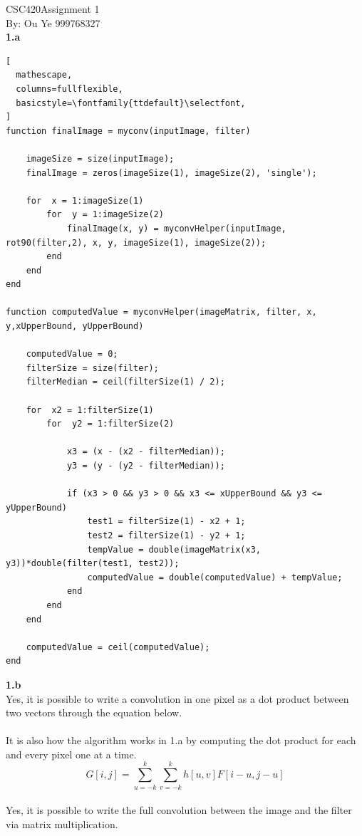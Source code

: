 \documentclass[11pt]{article}
\begin{document}
 
\noindent
CSC420Assignment 1 \\
By: Ou Ye 999768327\\

\noindent
\textbf{1.a} 
\begin{lstlisting}[
  mathescape,
  columns=fullflexible,
  basicstyle=\fontfamily{ttdefault}\selectfont,
]
function finalImage = myconv(inputImage, filter) 

    imageSize = size(inputImage);
    finalImage = zeros(imageSize(1), imageSize(2), 'single');

    for  x = 1:imageSize(1)
        for  y = 1:imageSize(2)
            finalImage(x, y) = myconvHelper(inputImage, rot90(filter,2), x, y, imageSize(1), imageSize(2));
        end
    end
end

function computedValue = myconvHelper(imageMatrix, filter, x, y,xUpperBound, yUpperBound) 

    computedValue = 0;
    filterSize = size(filter);
    filterMedian = ceil(filterSize(1) / 2);
   
    for  x2 = 1:filterSize(1)
        for  y2 = 1:filterSize(2)
            
            x3 = (x - (x2 - filterMedian));
            y3 = (y - (y2 - filterMedian));

            if (x3 > 0 && y3 > 0 && x3 <= xUpperBound && y3 <= yUpperBound) 
                test1 = filterSize(1) - x2 + 1;
                test2 = filterSize(1) - y2 + 1;
                tempValue = double(imageMatrix(x3, y3))*double(filter(test1, test2));
                computedValue = double(computedValue) + tempValue;
            end
        end
    end
    
    computedValue = ceil(computedValue);
end
\end{lstlisting}

\noindent
\textbf{1.b} \\
Yes, it is possible to write a convolution in one pixel as a dot product between two vectors through the equation below. \\\\
It is also how the algorithm works in 1.a by computing the dot product for each and every pixel one at a time.\\
$$G[i,j] = \sum_{u=-k}^{k}\sum_{v=-k}^{k}h[u,v]F[i - u, j -u]$$\\

\noindent
Yes, it is possible to write the full convolution between the image and the filter via matrix multiplication.\\
\end{document}
